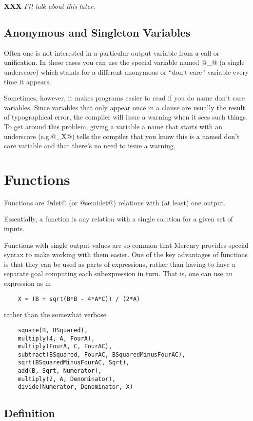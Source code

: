 \documentclass[a4paper,11pt,notitlepage,onecolumn]{article}
\makeatletter
\newcommand{\eg}%
{e.g.\@ }
\newcommand{\XXX}[1]%
{{\small\textbf{XXX} \emph{#1}}}
\makeatother
\begin{document}
\XXX{I'll talk about this later.}

\subsection{Anonymous and Singleton Variables}

Often one is not interested in a particular output variable
from a call or unification.  In these cases you can use the
special variable named @_@ (a single underscore) which stands
for a different anonymous or ``don't care'' variable every time
it appears.

Sometimes, however, it makes programs easier to read if you do
name don't care variables.  Since variables that only appear
once in a clause are usually the result of typographical
error, the compiler will issue a warning when it sees such
things.  To get around this problem, giving a variable a
name that starts with an underscore (\eg @_X@) tells the compiler that
you know this is a named don't care variable and that there's
no need to issue a warning.



\section{Functions}

Functions are @det@ (or @semidet@) relations with (at least) one output.

Essentially, a function is any relation with a single solution for
a given set of inputs.

Functions with single output values are so common that Mercury provides
special syntax to make working with them easier.  One of the key
advantages of functions is that they can be used as parts of
expressions, rather than having to have a separate goal computing each
subexpression in turn.  That is, one can use an expression as in
\begin{verbatim}
    X = (B + sqrt(B*B - 4*A*C)) / (2*A)
\end{verbatim}
rather than the somewhat verbose
\begin{verbatim}
    square(B, BSquared),
    multiply(4, A, FourA),
    multiply(FourA, C, FourAC),
    subtract(BSquared, FourAC, BSquaredMinusFourAC),
    sqrt(BSquaredMinusFourAC, Sqrt),
    add(B, Sqrt, Numerator),
    multiply(2, A, Denominator),
    divide(Numerator, Denominator, X)
\end{verbatim}

\subsection{Definition}
\end{document}
